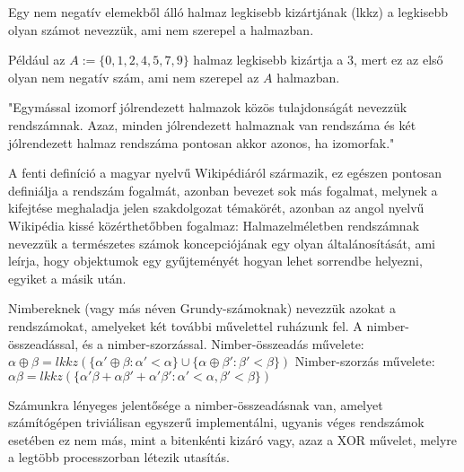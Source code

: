 \begin{definition}
	Egy nem negatív elemekből álló halmaz legkisebb kizártjának (lkkz) a legkisebb olyan számot nevezzük, ami nem szerepel a halmazban.
\end{definition}

\begin{example}
	Például az $A:=\{0, 1, 2, 4, 5, 7, 9\}$ halmaz legkisebb kizártja a 3, mert ez az első olyan nem negatív szám, ami nem szerepel az $A$ halmazban.
\end{example}

\begin{definition}
	"Egymással izomorf jólrendezett halmazok közös tulajdonságát nevezzük rendszámnak. Azaz, minden jólrendezett halmaznak van rendszáma és két jólrendezett halmaz rendszáma pontosan akkor azonos, ha izomorfak."
\end{definition}

\begin{remark}
	A fenti definíció a magyar nyelvű Wikipédiáról származik, ez egészen pontosan definiálja a rendszám fogalmát, azonban bevezet sok más fogalmat, melynek a kifejtése meghaladja jelen szakdolgozat témakörét, azonban az angol nyelvű Wikipédia kissé közérthetőbben fogalmaz:
	Halmazelméletben rendszámnak nevezzük a természetes számok koncepciójának egy olyan általánosítását, ami leírja, hogy objektumok egy gyűjteményét hogyan lehet sorrendbe helyezni, egyiket a másik után.
\end{remark}

\begin{definition}
	Nimbereknek (vagy más néven Grundy-számoknak) nevezzük azokat a rendszámokat, amelyeket két további művelettel ruházunk fel. A nimber-összeadással, és a nimber-szorzással.\ujsor
	Nimber-összeadás művelete: $\alpha \oplus \beta = lkkz(\{\alpha' \oplus \beta: \alpha' < \alpha\} \cup \{\alpha \oplus \beta': \beta' < \beta \})$\ujsor
	Nimber-szorzás művelete: $\alpha \beta = lkkz(\{\alpha' \beta + \alpha \beta' + \alpha' \beta': \alpha' < \alpha, \beta' <  \beta\})$
\end{definition}

\begin{remark}
	Számunkra lényeges jelentősége a nimber-összeadásnak van, amelyet számítógépen triviálisan egyszerű implementálni, ugyanis véges rendszámok esetében ez nem más, mint a bitenkénti kizáró vagy, azaz a XOR művelet, melyre a legtöbb processzorban létezik utasítás. 
\end{remark}

